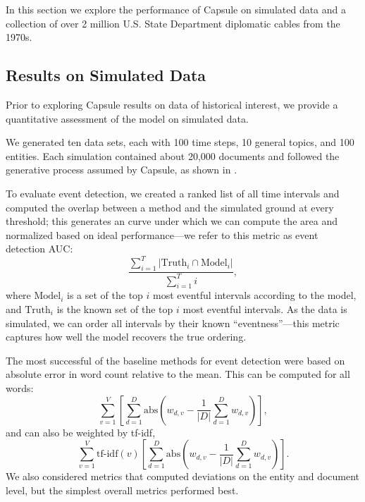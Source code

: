 

In this section we explore the performance of Capsule on simulated data and a collection of over 2 million U.S. State Department diplomatic cables from the 1970s.


\subsection{Results on Simulated Data}
\label{sec:valid}
Prior to exploring Capsule results on data of historical interest, we provide a quantitative assessment of the model on simulated data.

We generated ten data sets, each with 100 time steps, 10 general topics, and 100 entities. Each simulation contained about 20,000 documents and followed the generative process assumed by Capsule, as shown in .

To evaluate event detection, we created a ranked list of all time intervals and computed the overlap between a method and the simulated ground at every threshold; this generates an curve under which we can compute the area and normalized based on ideal performance---we refer to this metric as event detection AUC:
\begin{equation}
\frac{\sum_{i=1}^T \vert \mbox{Truth}_i \cap \mbox{Model}_i \vert}{\sum_{i=1}^T i},
\end{equation}
where $\mbox{Model}_i$ is a set of the top $i$ most eventful intervals according to the model, and $\mbox{Truth}_i$ is the known set of the top $i$ most eventful intervals.  As the data is simulated, we can order all intervals by their known ``eventness''---this metric captures how well the model recovers the true ordering.

The most successful of the baseline methods for event detection were based on absolute error in word count relative to the mean.  This can be computed for all words:
\begin{equation}
	\sum_{v=1}^V\left[\sum_{d=1}^D \mbox{abs}\left( w_{d,v} - \frac{1}{\vert D \vert}\sum_{d=1}^D w_{d,v} \right) \right],
\label{eq:wordev}
\end{equation}
and can also be weighted by tf-idf,
\begin{equation}
	\sum_{v=1}^V\mbox{tf-idf}(v)\left[\sum_{d=1}^D \mbox{abs}\left( w_{d,v} - \frac{1}{\vert D \vert}\sum_{d=1}^D w_{d,v} \right) \right].
\label{eq:tfidfwordev}
\end{equation}
We also considered metrics that computed deviations on the entity and document level, but the simplest overall metrics performed best.

